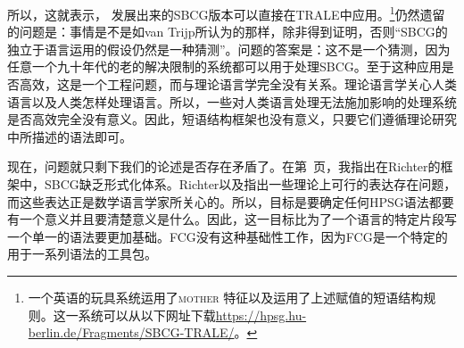 所以，这就表示，\citet{Sag2012a} 发展出来的SBCG版本可以直接在TRALE中应用。\footnote{%
一个英语的玩具系统运用了\textsc{mother} 特征以及运用了上述赋值的短语结构规则。这一系统可以从以下网址下载\url{https://hpsg.hu-berlin.de/Fragments/SBCG-TRALE/}。%
}仍然遗留的问题是：事情是不是如van Trijp所认为的那样，除非得到证明，否则“SBCG的独立于语言运用的假设仍然是一种猜测”。问题的答案是：这不是一个猜测，因为任意一个九十年代的老的解决限制的系统都可以用于处理SBCG。至于这种应用是否高效，这是一个工程问题，而与理论语言学完全没有关系。理论语言学关心人类语言以及人类怎样处理语言。所以，一些对人类语言处理无法施加影响的处理系统是否高效完全没有意义。因此，短语结构框架也没有意义，只要它们遵循理论研究中所描述的语法即可。

现在，问题就只剩下我们的论述是否存在矛盾了。在第~\pageref{page-sbcg-formalization}页，我指出在Richter的框架\citep{Richter2004a-u}中，SBCG缺乏形式化体系。Richter以及\citet{LM2006a}指出一些理论上可行的表达存在问题，而这些表达正是数学语言学家所关心的。所以，目标是要确定任何HPSG语法都要有一个意义并且要清楚意义是什么。因此，这一目标比为了一个语言的特定片段写一个单一的语法要更加基础。FCG没有这种基础性工作，因为FCG是一个特定的用于一系列语法的工具包。

